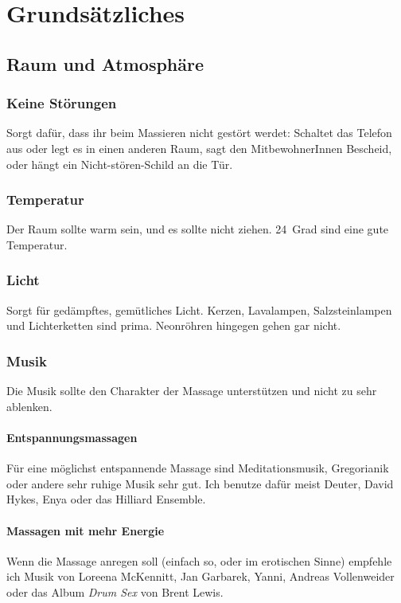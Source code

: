 \chapter{Grundsätzliches}

\section{Raum und Atmosphäre}

\subsection{Keine Störungen}

Sorgt dafür, dass ihr beim Massieren nicht gestört werdet: Schaltet das Telefon aus oder legt es in einen anderen Raum, sagt den MitbewohnerInnen Bescheid, oder hängt ein Nicht-stören-Schild an die Tür.

\subsection{Temperatur}

Der Raum sollte warm sein, und es sollte nicht ziehen. 24~Grad sind eine gute Temperatur.

\subsection{Licht}

Sorgt für gedämpftes, gemütliches Licht. Kerzen, Lavalampen, Salzsteinlampen und Lichterketten sind prima. Neonröhren hingegen gehen gar nicht.

\subsection{Musik}
Die Musik sollte den Charakter der Massage unterstützen und nicht zu sehr ablenken.

\subsubsection{Entspannungsmassagen}
Für eine möglichst entspannende Massage sind Meditationsmusik, Gregorianik oder andere sehr ruhige Musik sehr gut. Ich benutze dafür meist Deuter, David Hykes, Enya oder das Hilliard Ensemble.

\subsubsection{Massagen mit mehr Energie}
Wenn die Massage anregen soll (einfach so, oder im erotischen Sinne) empfehle ich Musik von Loreena McKennitt, Jan Garbarek, Yanni, Andreas Vollenweider oder das Album \emph{Drum Sex} von Brent Lewis.



